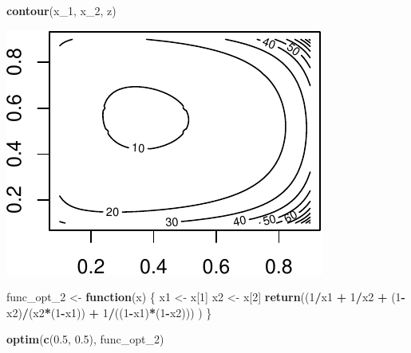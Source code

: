 \documentclass[11pt,]{article}
\newenvironment{Shaded}{\begin{snugshade}}{\end{snugshade}}
\newcommand{\KeywordTok}[1]{\textcolor[rgb]{0.13,0.29,0.53}{\textbf{#1}}}
\newcommand{\DecValTok}[1]{\textcolor[rgb]{0.00,0.00,0.81}{#1}}
\newcommand{\FloatTok}[1]{\textcolor[rgb]{0.00,0.00,0.81}{#1}}
\newcommand{\StringTok}[1]{\textcolor[rgb]{0.31,0.60,0.02}{#1}}
\newcommand{\ControlFlowTok}[1]{\textcolor[rgb]{0.13,0.29,0.53}{\textbf{#1}}}
\newcommand{\OperatorTok}[1]{\textcolor[rgb]{0.81,0.36,0.00}{\textbf{#1}}}
\newcommand{\NormalTok}[1]{#1}
\begin{document}
\begin{Shaded}
\begin{Highlighting}[]
\KeywordTok{contour}\NormalTok{(x_}\DecValTok{1}\NormalTok{, x_}\DecValTok{2}\NormalTok{, z)}
\end{Highlighting}
\end{Shaded}

\begin{center}\includegraphics{Optimization_files/figure-latex/opt_unconstr_optim_2-4} \end{center}

\begin{Shaded}
\begin{Highlighting}[]
\NormalTok{func_opt_}\DecValTok{2}\NormalTok{ <-}\StringTok{ }\ControlFlowTok{function}\NormalTok{(x)}
\NormalTok{\{}
\NormalTok{  x1 <-}\StringTok{ }\NormalTok{x[}\DecValTok{1}\NormalTok{]}
\NormalTok{  x2 <-}\StringTok{ }\NormalTok{x[}\DecValTok{2}\NormalTok{]}
  \KeywordTok{return}\NormalTok{((}\DecValTok{1}\OperatorTok{/}\NormalTok{x1 }\OperatorTok{+}\StringTok{ }\DecValTok{1}\OperatorTok{/}\NormalTok{x2 }\OperatorTok{+}\StringTok{ }
\StringTok{            }\NormalTok{(}\DecValTok{1}\OperatorTok{-}\NormalTok{x2)}\OperatorTok{/}\NormalTok{(x2}\OperatorTok{*}\NormalTok{(}\DecValTok{1}\OperatorTok{-}\NormalTok{x1)) }\OperatorTok{+}\StringTok{ }
\StringTok{            }\DecValTok{1}\OperatorTok{/}\NormalTok{((}\DecValTok{1}\OperatorTok{-}\NormalTok{x1)}\OperatorTok{*}\NormalTok{(}\DecValTok{1}\OperatorTok{-}\NormalTok{x2)))}
\NormalTok{         )}
\NormalTok{\}}

\KeywordTok{optim}\NormalTok{(}\KeywordTok{c}\NormalTok{(}\FloatTok{0.5}\NormalTok{, }\FloatTok{0.5}\NormalTok{), func_opt_}\DecValTok{2}\NormalTok{)}
\end{Highlighting}
\end{Shaded}
\end{document}
